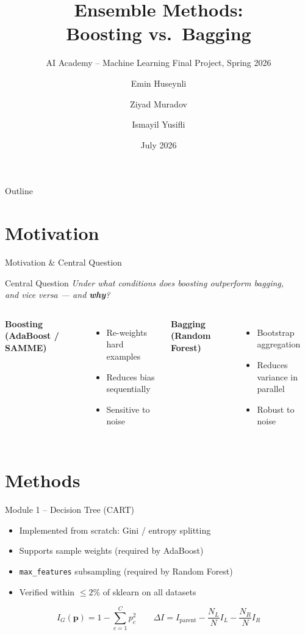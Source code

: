 \documentclass[aspectratio=169,12pt]{beamer}
\title[Boosting vs.\ Bagging]{Ensemble Methods:\\Boosting vs.\ Bagging}
\subtitle{AI Academy -- Machine Learning Final Project, Spring 2026}
\author{Emin Huseynli \and Ziyad Muradov \and Ismayil Yusifli}
\institute{AI Academy, National AI Center}
\date{July 2026}
\begin{document}
\begin{frame}
\titlepage
\end{frame}

\begin{frame}{Outline}
\tableofcontents
\end{frame}

\section{Motivation}
\begin{frame}{Motivation \& Central Question}
\begin{block}{Central Question}
  \textit{Under what conditions does boosting outperform bagging,\\
  and vice versa --- and \textbf{why}?}
\end{block}

\bigskip
\begin{columns}
\textbf{Boosting (AdaBoost / SAMME)}
\begin{itemize}
  \item Re-weights hard examples
  \item Reduces bias sequentially
  \item Sensitive to noise
\end{itemize}
\textbf{Bagging (Random Forest)}
\begin{itemize}
  \item Bootstrap aggregation
  \item Reduces variance in parallel
  \item Robust to noise
\end{itemize}
\end{columns}
\end{frame}

\section{Methods}
\begin{frame}{Module 1 -- Decision Tree (CART)}
\begin{itemize}
  \item Implemented from scratch: Gini / entropy splitting
  \item Supports sample weights (required by AdaBoost)
  \item \texttt{max\_features} subsampling (required by Random Forest)
  \item Verified within $\leq 2\%$ of sklearn on all datasets
\end{itemize}
\vfill
\[
  I_G(\mathbf{p}) = 1 - \sum_{c=1}^{C} p_c^2
  \qquad
  \Delta I = I_{\text{parent}} - \frac{N_L}{N}I_L - \frac{N_R}{N}I_R
\]
\end{frame}
\end{document}
